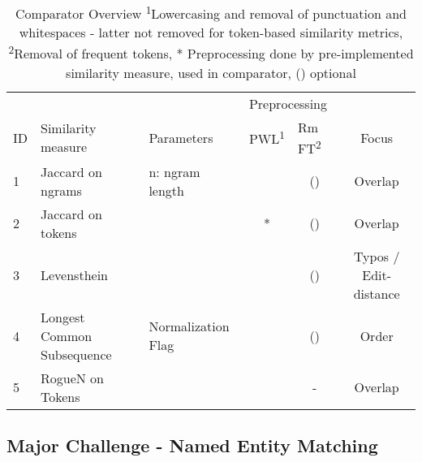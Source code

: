 \documentclass[11pt,titlepage,oneside,openany]{book}
\begin{document}
\begin{table}[b]
	\label{table:comparators}
	
	\begin{tabular}{lllccc}
		& \multicolumn{2}{l}{}                              & \multicolumn{2}{l}{Preprocessing}                   & \\
		ID & Similarity   measure       & Parameters           & \multicolumn{1}{l}{PWL\textsuperscript{1}} & \multicolumn{1}{l}{Rm FT\textsuperscript{2}} & Focus\\
		1  & Jaccard on ngrams          & n: ngram   length    & \checked & (\checked)                     & Overlap\\
		2  & Jaccard on tokens          &                      & *                       & (\checked)                       &Overlap\\
		3  & Levensthein                &                      & \checked & (\checked)                       &Typos / Edit-distance\\
		4  & Longest Common Subsequence & Normalization   Flag & \checked & (\checked)                       & Order\\
		5  & RogueN on Tokens \cite{lin_rouge_2004} & & \checked & -  & Overlap                      
	\end{tabular}

\caption[Comparator Overview]%
{Comparator Overview \small\medspace\medspace \textsuperscript{1}Lowercasing and removal of punctuation and whitespaces -  latter not removed for token-based similarity metrics, \textsuperscript{2}Removal of frequent tokens, * Preprocessing done by pre-implemented similarity measure, \checked \space used in comparator, (\checked) optional}

\end{table}

\subsection{Major Challenge - Named Entity Matching}
\end{document}
